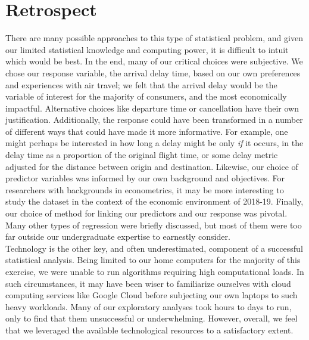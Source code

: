 \documentclass[12pt, a4paper]{book}
\newcommand\tab[1][1cm]{\hspace*{#1}}
\begin{document}
	\section{Retrospect}
	\tab There are many possible approaches to this type of statistical problem, and given our limited statistical knowledge and computing power, it is difficult to intuit which would be best. In the end, many of our critical choices were subjective. We chose our response variable, the arrival delay time, based on our own preferences and experiences with air travel; we felt that the arrival delay would be the variable of interest for the majority of consumers, and the most economically impactful. Alternative choices like departure time or cancellation have their own justification. Additionally, the response could have been transformed in a number of different ways that could have made it more informative. For example, one might perhaps be interested in how long a delay might be only \textit{if} it occurs, in the delay time as a proportion of the original flight time, or some delay metric adjusted for the distance between origin and destination. Likewise, our choice of predictor variables was informed by our own background and objectives. For researchers with backgrounds in econometrics, it may be more interesting to study the dataset in the context of the economic environment of 2018-19. Finally, our choice of method for linking our predictors and our response was pivotal. Many other types of regression were briefly discussed, but most of them were too far outside our undergraduate expertise to earnestly consider.  \\
	\tab  Technology is the other key, and often underestimated, component of a successful statistical analysis. Being limited to our home computers for the majority of this exercise, we were unable to run algorithms requiring high computational loads. In such circumstances, it may have been wiser to familiarize ourselves with cloud computing services like Google Cloud before subjecting our own laptops to such heavy workloads. Many of our exploratory analyses took hours to days to run, only to find that them unsuccessful or underwhelming. However, overall, we feel that we leveraged the available technological resources to a satisfactory extent. 
\end{document}
